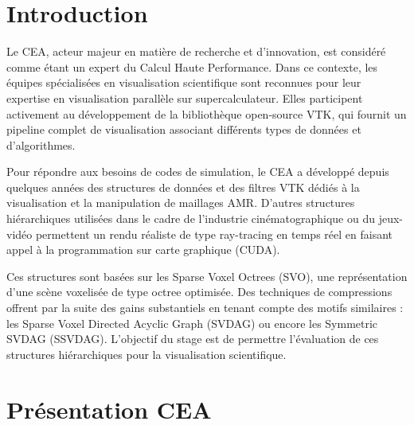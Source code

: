 \documentclass[12pt,a4paper,twoside]{article}
\begin{document}
    \newpage

    \renewcommand{\contentsname}{Sommaire}

    \tableofcontents


    \newpage

    \lstset{numbers=left, tabsize=3, frame=single, numberstyle=\ttfamily,
    basicstyle=\footnotesize}
    \thispagestyle{empty}

    \section{Introduction}                          %



    Le CEA, acteur majeur en matière de recherche et d’innovation, est considéré comme étant un expert du Calcul Haute
    Performance. Dans ce contexte, les équipes spécialisées en visualisation scientifique sont reconnues pour
    leur expertise en visualisation parallèle sur supercalculateur. Elles participent activement au développement de la
    bibliothèque open-source VTK, qui fournit un pipeline complet de visualisation associant différents types de données
    et d’algorithmes.

    Pour répondre aux besoins de codes de simulation, le CEA a développé depuis quelques années des
    structures de données et des filtres VTK dédiés à la visualisation et la manipulation de maillages AMR. D’autres
    structures hiérarchiques utilisées dans le cadre de l’industrie cinématographique ou du jeux-vidéo permettent un rendu
    réaliste de type ray-tracing en temps réel en faisant appel à la programmation sur carte graphique (CUDA).

    Ces structures
    sont basées sur les Sparse Voxel Octrees (SVO), une représentation d’une scène voxelisée de type octree optimisée.
    Des techniques de compressions offrent par la suite des gains substantiels en tenant compte des motifs similaires :
    les Sparse Voxel Directed Acyclic Graph (SVDAG) ou encore les Symmetric SVDAG (SSVDAG).
    L’objectif du stage est de permettre l’évaluation de ces structures hiérarchiques pour la visualisation scientifique.

    \newpage

    \section{Présentation CEA}                              %
\end{document}
